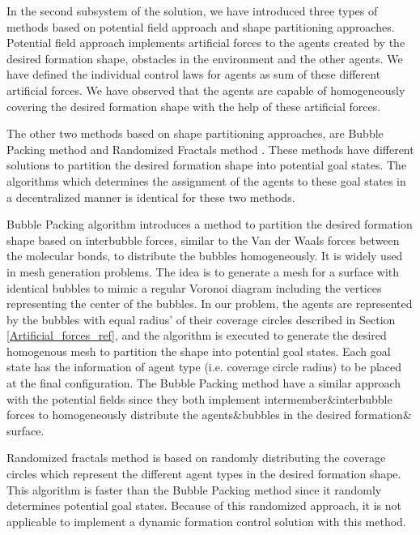 In the second subsystem of the solution, we have introduced three types of methods based on potential field approach and shape partitioning approaches. Potential field approach implements artificial forces to the agents created by the desired formation shape, obstacles in the environment and the other agents. We have defined the individual control laws for agents as sum of these different artificial forces. We have observed that the agents are capable of homogeneously covering the desired formation shape with the help of these artificial forces.

The other two methods based on shape partitioning approaches, are Bubble Packing method and Randomized Fractals method . These methods have different solutions to partition the desired formation shape into potential goal states. The algorithms which determines the assignment of the agents to these goal states in a decentralized manner is identical for these two methods. 

Bubble Packing algorithm introduces a method to partition the desired formation shape based on interbubble forces, similar to the Van der Waals forces between the molecular bonds, to distribute the bubbles homogeneously. It is widely used in mesh generation problems. The idea is to generate a mesh for a surface with identical bubbles to mimic a regular Voronoi diagram including the vertices representing the center of the bubbles. In our problem, the agents are represented by the  bubbles with equal radius' of their coverage circles described in Section \ref{Artificial_forces_ref}, and the algorithm is executed to generate the desired homogenous mesh to partition the shape into potential goal states. Each goal state has the information of agent type (i.e. coverage circle radius) to be placed at the final configuration. The Bubble Packing method have a similar approach with the potential fields since they both implement intermember$\&$interbubble forces to homogeneously distribute the agents$\&$bubbles in the desired formation$\&$surface.
       
Randomized fractals method is based on randomly distributing the coverage circles which represent the different agent types in the desired formation shape. This algorithm is faster than the Bubble Packing method since it randomly determines potential goal states. Because of this randomized approach, it is not applicable to implement a dynamic formation control solution with this method. 
       
